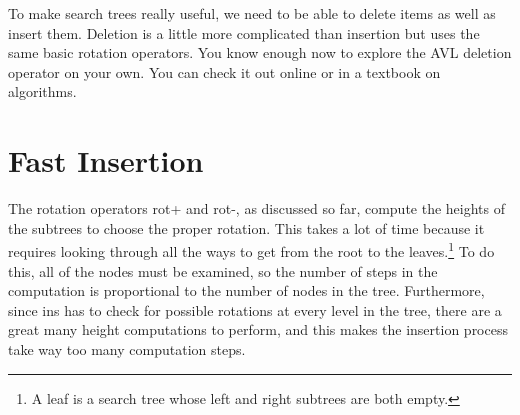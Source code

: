 To make search trees really useful, we need to be able to delete items
as well as insert them.
Deletion is a little more complicated than
insertion but uses the same basic rotation operators.
You know enough now to explore the AVL deletion operator on your own.
You can check it out online or in a textbook on algorithms.

\begin{exercises}




\end{exercises}

\section{Fast Insertion}

The rotation operators \textsf{rot}+ and \textsf{rot-}, as discussed so far,
compute the heights of the subtrees to choose the proper rotation.
This takes a lot of time because it requires
looking through all the ways to get from the root to the leaves.\footnote{A
leaf is a search tree whose left and right subtrees are both empty.}
To do this, all of the nodes must be examined, so the number of steps in
the computation is proportional to the number of nodes in the tree.
Furthermore, since \textsf{ins} has to check
for possible rotations at every level in the
tree, there are a great many height computations to perform, and this
makes the insertion process take way too many computation steps.

